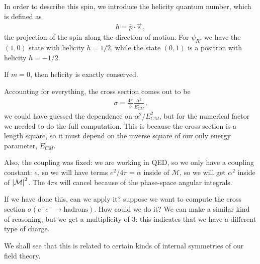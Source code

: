 \documentclass[main.tex]{subfiles}
\begin{document}
In order to describe this spin, we introduce the helicity quantum number, which is defined as 
%
\begin{align}
h = \hat{p} \cdot \vec{s}
\,,
\end{align}
%
the projection of the spin along the direction of motion. 
For \(\psi_{R}\), we have the \((1,0)\) state with helicity \(h = 1/2\), while the state \((0,1)\) is a positron with helicity \(h = - 1/2\). 

If \(m=0\), then helicity is exactly conserved. 

Accounting for everything, the cross section comes out to be 
%
\begin{align}
\sigma = \frac{4 \pi }{3} \frac{\alpha^2}{E^2_{CM}}
\,.
\end{align}
%
we could have guessed the dependence on \(\alpha^2  / E^2_{CM}\), but for the numerical factor we needed to do the full computation. 
This is because the cross section is a length square, so it must depend on the inverse square of our only energy parameter, \(E_{CM}\). 

Also, the coupling was fixed: we are working in QED, so we only have a coupling constant: \(e\), so we will have terms \(e^2 / 4 \pi = \alpha \) inside of \(\mathcal{M}\), so we will get \(\alpha^2\) inside of \(\abs{\mathcal{M}}^2\). 
The \(4 \pi \)s will cancel because of the phase-space angular integrals.

If we have done this, can we apply it? suppose we want to compute the cross section \(\sigma (e^{+}e^{-} \to \text{hadrons})\). How could we do it?
We can make a similar kind of reasoning, but we get a multiplicity of 3: this indicates that we have a different type of charge.

We shall see that this is related to certain kinds of internal symmetries of our field theory. 
\end{document}
